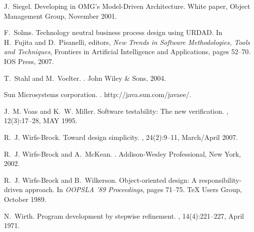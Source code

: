 \documentclass{IOS-Book-Article}
\begin{document}
\begin{thebibliography}{10}
J.~Siegel.
\newblock Developing in {OMG}'s {M}odel-{D}riven {A}rchitecture.
\newblock White paper, Object Management Group, November 2001.

F.~Solms.
\newblock Technology neutral business process design using {URDAD}.
\newblock In H.~Fujita and D.~Pisanelli, editors, {\em New Trends in Software
  Methodologies, Tools and Techniques}, Frontiers in Artificial Intelligence
  and Applications, pages 52--70. IOS Press, 2007.

T.~Stahl and M.~Voelter.
.
\newblock John Wiley \& Sons, 2004.

{Sun Microsystems corporation}.
.
\newblock http://java.sun.com/javaee/.

J.~M. Voas and K.~W. Miller.
\newblock Software testability: The new verification.
, 12(3):17--28, MAY 1995.

R.~J. Wirfs-Brock.
\newblock Toward design simplicity.
, 24(2):9--11, March/April 2007.

R.~J. Wirfs-Brock and A.~McKean.
.
\newblock Addison-Wesley Professional, New York, 2002.

R.~J. Wirfs-Brock and B.~Wilkerson.
\newblock Object-oriented design: A responsibility-driven approach.
\newblock In {\em OOPSLA '89 Proceedings}, pages 71--75. TeX Users Group,
  October 1989.

N.~Wirth.
\newblock Program development by stepwise refinement.
, 14(4):221--227, April 1971.

\end{thebibliography}
%
%
\end{document}
